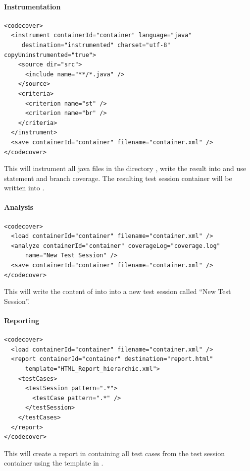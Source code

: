 \paragraph{Instrumentation}

\begin{verbatim}
<codecover>
  <instrument containerId="container" language="java"
     destination="instrumented" charset="utf-8" copyUninstrumented="true">
    <source dir="src">
      <include name="**/*.java" />
    </source>
    <criteria>
      <criterion name="st" />
      <criterion name="br" />
    </criteria>
  </instrument>
  <save containerId="container" filename="container.xml" />
</codecover>
\end{verbatim}

This will instrument all java files in the directory , write the
result
into  and use statement and branch coverage.
The resulting test session container will be written into .

\paragraph{Analysis}

\begin{verbatim}
<codecover>
  <load containerId="container" filename="container.xml" />
  <analyze containerId="container" coverageLog="coverage.log"
      name="New Test Session" />
  <save containerId="container" filename="container.xml" />
</codecover>
\end{verbatim}

This will write the content of  into 
into a new test session called ``New Test Session''.

\paragraph{Reporting}

\begin{verbatim}
<codecover>
  <load containerId="container" filename="container.xml" />
  <report containerId="container" destination="report.html"
      template="HTML_Report_hierarchic.xml">
    <testCases>
      <testSession pattern=".*">
        <testCase pattern=".*" />
      </testSession>
    </testCases>
  </report>
</codecover>
\end{verbatim}

This will create a report in  containing all test cases
from the test session container  using the template in
.

